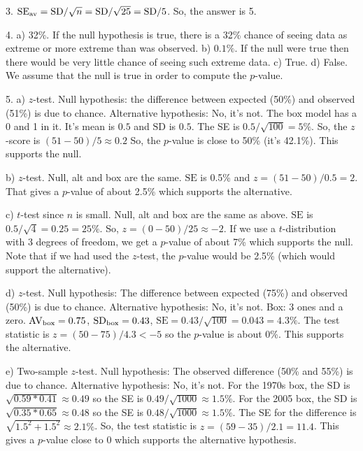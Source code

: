 \documentclass[10pt]{article}
\begin{document}
{{3. $\mbox{SE}_{\mbox{\scriptsize av}} = \mbox{SD}/\sqrt{n} = \mbox{SD}/\sqrt{25} = \mbox{SD}/5$.  So, the answer is 5.

4. a) 32\%.  If the null hypothesis is true, there is a 32\% chance of seeing data as extreme or more extreme
than was observed.  b) $0.1\%$.  If the null were true then there would be very little chance of seeing
such extreme data.  c) True.  d) False.  We assume that the null is true in order to compute the $p$-value.

5. a) $z$-test.   Null hypothesis:  the difference between expected (50\%) and observed (51\%) is due to chance.
Alternative hypothesis:  No, it's not.  The box model has a 0 and 1 in it.  It's mean is $0.5$
and $\mbox{SD}$ is $0.5$.
The SE is $0.5/\sqrt{100} = 5\%$.  So, the $z$-score is $(51-50)/5 \approx 0.2$  So, the $p$-value is
close to 50\% (it's 42.1\%).  This supports the null.

b) $z$-test.  Null, alt and box are the same.  $\mbox{SE}$ is 0.5\% and $z=(51-50)/0.5 =2$.  That gives a $p$-value
of about 2.5\% which supports the alternative.

c) $t$-test since $n$ is small.  Null, alt and box are the same as above.
$\mbox{SE}$ is $0.5/\sqrt{4}=0.25 = 25\%$.  So, $z=(0-50)/25 \approx -2$.
If we use a $t$-distribution with 3 degrees of freedom, we get a $p$-value of about 7\% which supports the null.
Note that if we had used the $z$-test, the $p$-value would be 2.5\% (which would support the alternative).

d) $z$-test.  Null hypothesis:  The difference between expected (75\%) and observed (50\%) is due to chance.
Alternative hypothesis:  No, it's not.  Box:  3 ones and a zero.  $\mbox{AV}_{\mbox{\scriptsize box}} = 0.75$,
$\mbox{SD}_{\mbox{\scriptsize box}} = 0.43$,
$\mbox{SE} = 0.43/\sqrt{100} = 0.043 = 4.3\%$.  The test statistic is $z=(50-75)/4.3 < -5$ so the $p$-value is
about 0\%.  This supports the alternative.

e) Two-sample $z$-test.  Null hypothesis:  The observed difference (50\% and 55\%) is due to chance.
Alternative hypothesis:  No, it's not.  For the 1970s box, the SD is $\sqrt{0.59 * 0.41}\approx 0.49$
so the SE is $0.49/\sqrt{1000} \approx 1.5\%$.  For the 2005 box, the SD is
$\sqrt{0.35* 0. 65} \approx 0.48$ so the SE  is $0.48/\sqrt{1000} \approx 1.5\%$.
The SE for the difference is $\sqrt{1.5^2 + 1.5^2}\approx 2.1\%$.  So, the test statistic
is $z = (59 - 35)/2.1 = 11.4$.  This gives a $p$-value close to 0 which supports the alternative hypothesis.}
\vfill

}
\end{document}
